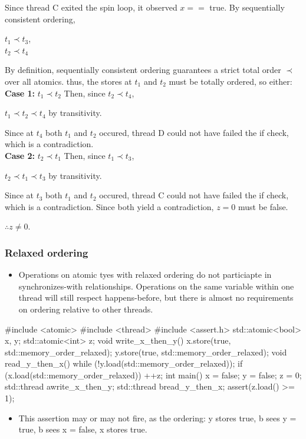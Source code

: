 \documentclass[11pt, a4paper]{article}
\theoremstyle{definition}
\theoremstyle{remark}
\begin{document}
Since thread C exited the spin loop, it observed $x ==$ true. By sequentially consistent ordering,
\begin{center}
$t_1\prec t_3$, \\
$t_2\prec t_4$\\
\end{center}
By definition, sequentially consistent ordering guarantees a strict total order $\prec$ over all atomics. thus, the stores at $t_1$ and $t_2$ must be totally ordered, so either:\\
\textbf{Case 1:} $t_1\prec t_2$
Then, since $t_2\prec t_4$,
\begin{center}
$t_1\prec t_2\prec t_4$ by transitivity.\\
\end{center}
Since at $t_4$ both $t_1$ and $t_2$ occured, thread D could not have failed the if check, which is a contradiction.\\
\textbf{Case 2:} $t_2\prec t_1$
Then, since $t_1\prec t_3$,
\begin{center}
$t_2\prec t_1\prec t_3$ by transitivity.\\
\end{center}
Since at $t_3$ both $t_1$ and $t_2$ occured, thread C could not have failed the if check, which is a contradiction.
Since both yield a contradiction, $z = 0$ must be false.
\begin{center}
$\therefore z\neq 0$.
\end{center}
\subsubsection{Relaxed ordering}
\begin{itemize}
    \item Operations on atomic tyes with relaxed ordering do not particiapte in synchronizes-with relationships. Operations on the same variable within one thread will still respect happens-before, but there is almost no requirements on ordering relative to other threads.
\end{itemize}
\begin{cppcode}
#include <atomic>
#include <thread>
#include <assert.h>
std::atomic<bool> x, y;
std::atomic<int> z;
void write_x_then_y() {
    x.store(true, std::memory_order_relaxed);
    y.store(true, std::memory_order_relaxed);
}
void read_y_then_x() {
    while (!y.load(std::memory_order_relaxed));
    if (x.load(std::memory_order_relaxed)) ++z;
}
int main() {
    x = false;
    y = false;
    z = 0;
    std::thread a{write_x_then_y};
    std::thread b{read_y_then_x};
    assert(z.load() >= 1);
}
\end{cppcode}
\begin{itemize}
    \item This assertion may or may not fire, as the ordering: y stores true, b sees y = true, b sees x = false, x stores true.
\end{itemize}
\end{document}
